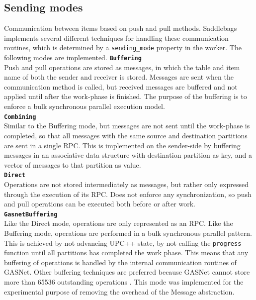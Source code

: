 \documentclass{uit-report}
\begin{document}
\subsection{Sending modes}
Communication between items based on push and pull methods. Saddlebags implements several different techniques for handling these communication routines, which is determined by a \texttt{sending\_mode} property in the worker. The following modes are implemented.
\newpage
\hspace{4ex} \textbf{\texttt{Buffering}}
\\
Push and pull operations are stored as messages, in which the table and item name of both the sender and receiver is stored. Messages are sent when the communication method is called, but received messages are buffered and not applied until after the work-phase is finished. The purpose of the buffering is to enforce a bulk synchronous parallel execution model.\\

\hspace{4ex} \textbf{\texttt{Combining}}
\\
Similar to the Buffering mode, but messages are not sent until the work-phase is completed, so that all messages with the same source and destination partitions are sent in a single RPC. This is implemented on the sender-side by buffering messages in an associative data structure with destination partition as key, and a vector of messages to that partition as value.\\

\hspace{4ex} \textbf{\texttt{Direct}}
\\
Operations are not stored intermediately as messages, but rather only expressed through the execution of its RPC. Does not enforce any synchronization, so push and pull operations can be executed both before or after work. \\

\hspace{4ex} \textbf{\texttt{GasnetBuffering}}
\\
Like the Direct mode, operations are only represented as an RPC. Like the Buffering mode, operations are performed in a bulk synchronous parallel pattern. This is achieved by not advancing UPC++ state, by not calling the \texttt{progress} function until all partitions has completed the work phase. This means that any buffering of operations is handled by the internal communication routines of GASNet. Other buffering techniques are preferred because GASNet cannot store more than 65536 outstanding operations \cite{gasnetpresentation}. This mode was implemented for the experimental purpose of removing the overhead of the Message abstraction.
\end{document}
